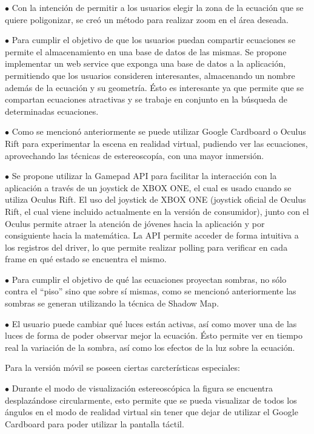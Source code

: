 \documentclass[12pt]{article}
\begin{document}
$\bullet$ Con la intención de permitir a los usuarios elegir la zona de la ecuación que se quiere poligonizar, se creó un método para realizar zoom en el área deseada.  

$\bullet$ Para cumplir el objetivo de que los usuarios puedan compartir ecuaciones se permite el almacenamiento en una base de datos de las mismas. Se propone implementar un web service que exponga una base de datos a la aplicación, permitiendo que los usuarios consideren interesantes, almacenando un nombre además de la ecuación y su geometría. Ésto es interesante ya que permite que se compartan ecuaciones atractivas y se trabaje en conjunto en la búsqueda de determinadas ecuaciones. 

$\bullet$ Como se mencionó anteriormente se puede utilizar Google Cardboard o Oculus Rift para experimentar la escena en realidad virtual, pudiendo ver las ecuaciones, aprovechando las técnicas de estereoscopía, con una mayor inmersión.

$\bullet$ Se propone utilizar la Gamepad API\cite{gamepadapi} para facilitar la interacción con la aplicación a través de un joystick de XBOX ONE, el cual es usado cuando se utiliza Oculus Rift. El uso del joystick de XBOX ONE (joystick oficial de Oculus Rift, el cual viene incluido actualmente en la versión de consumidor), junto con el Oculus permite atraer la atención de jóvenes hacia la aplicación y por consiguiente hacia la matemática. La API permite acceder de forma intuitiva a los registros del driver\cite{engine}, lo que permite realizar polling para verificar en cada frame en qué estado se encuentra el mismo.

$\bullet$ Para cumplir el objetivo de qué las ecuaciones proyectan sombras, no sólo contra el “piso” sino que sobre sí mismas, como se mencionó anteriormente las sombras se generan utilizando la técnica de Shadow Map\cite{shadowmap}\cite{realtimerendering}.


$\bullet$ El usuario puede cambiar qué luces están activas, así como mover una de las luces de forma de poder observar mejor la ecuación. Ésto permite ver en tiempo real la variación de la sombra, así como los efectos de la luz sobre la ecuación. 


Para la versión móvil se poseen ciertas carcterísticas especiales: 

$\bullet$ Durante el modo de visualización estereoscópica la figura se encuentra desplazándose circularmente, esto permite que se pueda visualizar de todos los ángulos en el modo de realidad virtual sin tener que dejar de utilizar el Google Cardboard para poder utilizar la pantalla táctil.
\end{document}
